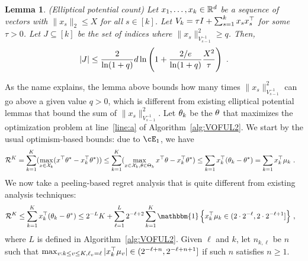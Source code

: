 \documentclass{article}
\newtheorem{lemma}{Lemma}
\def\one{\mathbbm{1}}
\newcommand{\blue}[1]{{\color[rgb]{.3,.5,1}#1}}
\renewcommand{\blue}[1]{#1}
\begin{document}
\begin{lemma}
  \label{lem:epc}
  (Elliptical potential count)
  Let $x_1, \ldots, x_k\in{\mathbb{R}}^d$ be a sequence of vectors with $\|x_s\|_2 \le X$ for all $s\in[k]$.
  Let ${V_k} = \tau I + \sum_{s=1}^{k} x_s x_s^{\top}$ for some ${\tau}>0$.
  Let ${J} \subseteq[k]$ be the set of indices where $\|x_s\|_{V_{s-1}^{-1}}^2 \ge q$.
  Then,
  \begin{align*}
    |J| \le \frac{2}{\ln(1+q)} d \ln \del{1 + \fr{2/e}{\ln(1+q)}\fr {X^2} {\tau}}~.
  \end{align*}
\end{lemma}
As the name explains, the lemma above bounds how many times $\|x_s\|_{V_{s-1}^{-1}}^2$ can go above a given value $q>0$, which is different from existing elliptical potential lemmas that bound the sum of $\|x_s\|^2_{V_{s-1}^{-1}}$.
%
Let ${{\theta}_k}$ be the ${\theta}$ that maximizes the optimization problem at line~\ref{line:a} of Algorithm~\ref{alg:VOFUL2}.
We start by the usual optimism-based bounds: due to $\cE_1$, we have %
\begin{align*}
    \mathcal{R}^K &=\sum_{k=1}^K (\max_{x\in \mathcal{X}_k}(x^{\top} {\theta}^*-x_k^{\top} {\theta}^*)) 
    \le \sum_{k=1}^K (\max_{x \in \mathcal{X}_k,{\theta} \in \Theta_k} x^{\top}{\theta} -x_k^{\top}{\theta}^*)
    \le \sum_{k=1} x_k^{\top}({\theta}_k - {\theta}^*) =\sum_{k=1} x_k^{\top} \mu_k~.
\end{align*}
We now take a peeling-based regret analysis that is quite different from existing analysis techniques: %
\begin{align*}
    \cR^K &\le \sum_{k=1}^{K} x_k^\T (\th_k - \th^*)
    \le {2^{-L}K +  \sum_{\ell=1}^{L} 2^{-\ell+2} \sum_{k=1}^{K}
      \one\cbr{x_k^\T\mu_k \in \lparen 2\cd2^{-\ell},2\cd2^{-\ell+1} \rbrack}  }~,
\end{align*}
where $L$ is defined in Algorithm~\ref{alg:VOFUL2}.
%
Given $\ell$ and $k$, let $\blue{n_{k,\ell}}$ be $n$ such that $\max_{v:k\le v\le K, \ell_v = \ell}|x_k^{\top} \mu_v|  \in \lparen 2^{-\ell+n},2^{-\ell+n+1}\rbrack$ if such $n$ satisfies $n\ge1$.
\end{document}
